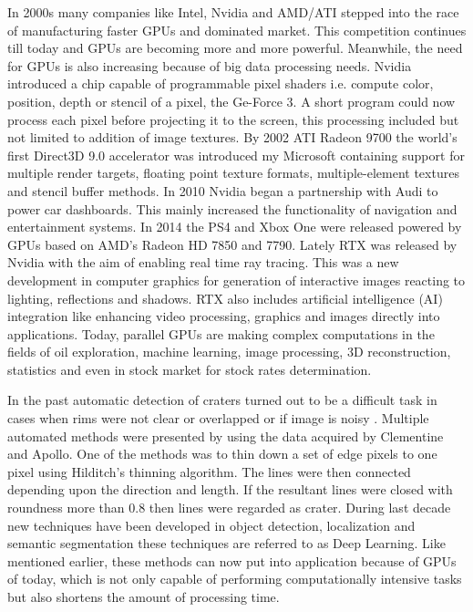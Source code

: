 \documentclass[11pt]{article}
\begin{document}
In 2000s many companies like Intel, Nvidia and AMD/ATI stepped into the race of manufacturing faster GPUs and dominated market. This competition continues till today and GPUs are becoming more and more powerful. Meanwhile, the need for GPUs is also increasing because of big data processing needs. Nvidia introduced a chip capable of programmable pixel shaders i.e. compute color, position, depth or stencil of a pixel, the Ge-Force 3. A short program could now process each pixel before projecting it to the screen, this processing included but not limited to addition of image textures. By 2002 ATI Radeon 9700 the world's first Direct3D 9.0 accelerator was introduced my Microsoft containing support for multiple render targets, floating point texture formats, multiple-element textures and stencil buffer methods. In 2010 Nvidia began a partnership with Audi to power car dashboards. This mainly increased the functionality of navigation and entertainment systems. In 2014 the PS4 and Xbox One were released powered by GPUs based on AMD's Radeon HD 7850 and 7790. Lately RTX was released by Nvidia with the aim of enabling real time ray tracing. This was a new development in computer graphics for generation of interactive images reacting to lighting, reflections and shadows. RTX also includes artificial intelligence (AI) integration like enhancing video processing, graphics and images directly into applications. Today, parallel GPUs are making complex computations in the fields of oil exploration, machine learning, image processing, 3D reconstruction, statistics and even in stock market for stock rates determination. 

In the past automatic detection of craters turned out to be a difficult task in cases when rims were not clear or overlapped or if image is noisy \cite{sawabe_2006}. Multiple automated methods were presented by \cite{sawabe_2006} using the data acquired by Clementine and Apollo. One of the methods was to thin down a set of edge pixels to one pixel using Hilditch's thinning algorithm. The lines were then connected depending upon the direction and length. If the resultant lines were closed with roundness more than 0.8 then lines were regarded as crater. During last decade new techniques have been developed in object detection, localization and semantic segmentation these techniques are referred to as Deep Learning. Like mentioned earlier, these methods can now put into application because of GPUs of today, which is not only capable of performing computationally intensive tasks but also shortens the amount of processing time.
\end{document}
